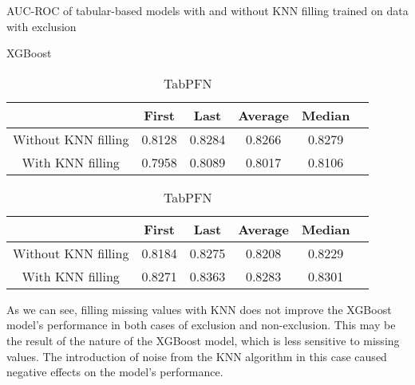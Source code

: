 \documentclass[../main.tex]{subfiles}
\begin{document}
\begin{table}[H]
    \centering
    \caption{AUC-ROC of tabular-based models with and without KNN filling trained on data with exclusion}
    \label{tab:knn_filling_with_limit}

    \begin{subtable}{\textwidth}
        \centering
        \caption{XGBoost}

        \begin{tabular}{|c|c|c|c|c|c|}
            \hline
            \textbf{} & 
            \textbf{First} & 
            \textbf{Last} & 
            \textbf{Average} &
            \textbf{Median} \\
            \hline

            Without KNN filling & 
            0.8128 & 
            0.8284 & 
            0.8266 &
            0.8279 \\

            With KNN filling & 
            0.7958 & 
            0.8089 & 
            0.8017 &
            0.8106 \\

            \hline
        \end{tabular}
    \end{subtable}

    \vspace{1cm}

    \begin{subtable}{\textwidth}
        \centering
        \caption{TabPFN}

        \begin{tabular}{|c|c|c|c|c|c|}
            \hline
            \textbf{} & 
            \textbf{First} & 
            \textbf{Last} & 
            \textbf{Average} &
            \textbf{Median} \\
            \hline

            Without KNN filling & 
            0.8184 & 
            0.8275 & 
            0.8208 &
            0.8229 \\

            With KNN filling & 
            0.8271 & 
            0.8363 & 
            0.8283 &
            0.8301 \\

            \hline
        \end{tabular}
    \end{subtable}
\end{table}

As we can see, filling missing values with KNN does not improve the XGBoost model's performance in both cases of exclusion and non-exclusion.
This may be the result of the nature of the XGBoost model, which is less sensitive to missing values.
The introduction of noise from the KNN algorithm in this case caused negative effects on the model's performance.
\end{document}
